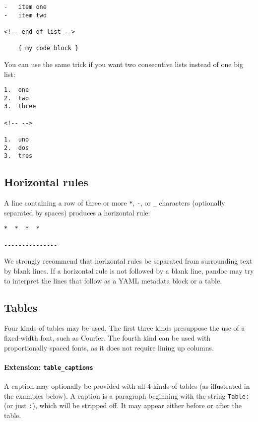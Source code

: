 \documentclass[
]{article}
\begin{document}
\begin{verbatim}
-   item one
-   item two

<!-- end of list -->

    { my code block }
\end{verbatim}

You can use the same trick if you want two consecutive lists instead of
one big list:

\begin{verbatim}
1.  one
2.  two
3.  three

<!-- -->

1.  uno
2.  dos
3.  tres
\end{verbatim}

\hypertarget{horizontal-rules}{%
\subsection{Horizontal rules}\label{horizontal-rules}}

A line containing a row of three or more \texttt{*}, \texttt{-}, or
\texttt{\_} characters (optionally separated by spaces) produces a
horizontal rule:

\begin{verbatim}
*  *  *  *

---------------
\end{verbatim}

We strongly recommend that horizontal rules be separated from
surrounding text by blank lines. If a horizontal rule is not followed by
a blank line, pandoc may try to interpret the lines that follow as a
YAML metadata block or a table.

\hypertarget{tables}{%
\subsection{Tables}\label{tables}}

Four kinds of tables may be used. The first three kinds presuppose the
use of a fixed-width font, such as Courier. The fourth kind can be used
with proportionally spaced fonts, as it does not require lining up
columns.

\hypertarget{extension-table_captions}{%
\paragraph{\texorpdfstring{Extension:
\texttt{table\_captions}}{Extension: table\_captions}}\label{extension-table_captions}}

A caption may optionally be provided with all 4 kinds of tables (as
illustrated in the examples below). A caption is a paragraph beginning
with the string \texttt{Table:} (or just \texttt{:}), which will be
stripped off. It may appear either before or after the table.
\end{document}
